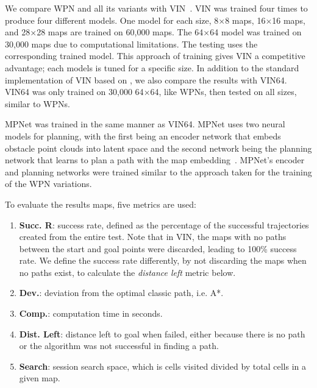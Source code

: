 \documentclass[journal, twocolumn]{IEEEtran}
\begin{document}
We compare WPN and all its variants with VIN~\cite{tamar2016value}. VIN was trained four times to produce four different models. One model for each size, 8$\times$8 maps, 16$\times$16 maps, and 28$\times$28 maps are trained on 60,000 maps. The 64$\times$64 model was trained on 30,000 maps due to computational limitations. The testing uses the corresponding trained model. This approach of training gives VIN a competitive advantage; each models is tuned for a specific size.
In addition to the standard implementation of VIN based on \cite{tamar2016value}, we also compare the results with VIN64. VIN64 was only trained on 30,000 64$\times$64, like WPNs, then tested on all sizes, similar to WPNs.

MPNet was trained in the same manner as VIN64. MPNet uses two neural models for planning, with the first being an encoder network that embeds obstacle point clouds into latent space and the second network being the planning network that learns to plan a path with the map embedding~\cite{qureshi2019motion}. MPNet's encoder and planning networks were trained similar to the approach taken for the training of the WPN variations.

To evaluate the results maps, five metrics are used:
\begin{enumerate}
    \item {\bf Succ. R}: success rate, defined as the percentage of the successful trajectories created from the entire test. Note that in VIN, the maps with no paths between the start and goal points were discarded, leading to 100\% success rate. We define the success rate differently, by not discarding the maps when no paths exist, to calculate the \emph{distance left} metric below.
    \item {\bf Dev.}: deviation from the optimal classic path, i.e. A*.
    \item {\bf Comp.}: computation time in seconds.
    \item {\bf Dist. Left}: distance left to goal when failed, either because there is no path or the algorithm was not successful in finding a path.
    \item {\bf Search}: session search space, which is cells visited divided by total cells in a given map. 
\end{enumerate}
\end{document}
